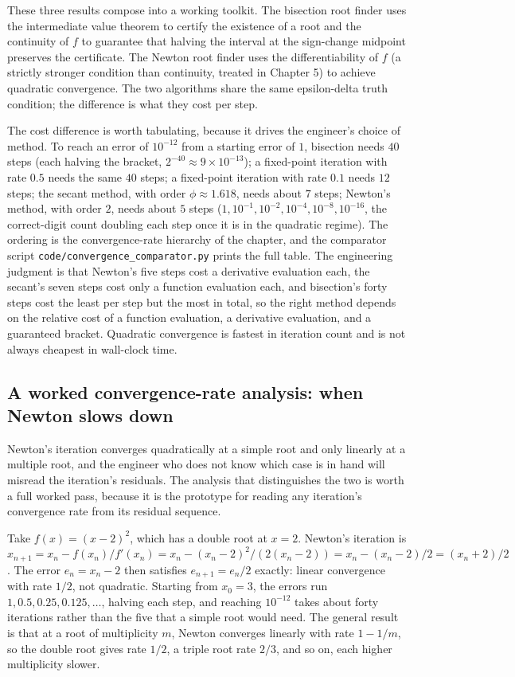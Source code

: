 These three results compose into a working toolkit. The bisection
root finder uses the intermediate value theorem to certify the
existence of a root and the continuity of $f$ to guarantee that
halving the interval at the sign-change midpoint preserves the
certificate. The Newton root finder uses the differentiability of
$f$ (a strictly stronger condition than continuity, treated in
Chapter 5) to achieve quadratic convergence. The two algorithms
share the same epsilon-delta truth condition; the difference is what
they cost per step.

The cost difference is worth tabulating, because it drives the
engineer's choice of method. To reach an error of $10^{-12}$ from a
starting error of $1$, bisection needs $40$ steps (each halving the
bracket, $2^{-40} \approx 9 \times 10^{-13}$); a fixed-point iteration
with rate $0.5$ needs the same $40$ steps; a fixed-point iteration with
rate $0.1$ needs $12$ steps; the secant method, with order $\phi
\approx 1.618$, needs about $7$ steps; Newton's method, with order $2$,
needs about $5$ steps ($1, 10^{-1}, 10^{-2}, 10^{-4}, 10^{-8},
10^{-16}$, the correct-digit count doubling each step once it is in the
quadratic regime). The ordering is the convergence-rate hierarchy of
the chapter, and the comparator script
\texttt{code/convergence\_comparator.py} prints the full table. The
engineering judgment is that Newton's five steps cost a derivative
evaluation each, the secant's seven steps cost only a function
evaluation each, and bisection's forty steps cost the least per step
but the most in total, so the right method depends on the relative cost
of a function evaluation, a derivative evaluation, and a guaranteed
bracket. Quadratic convergence is fastest in iteration count and is not
always cheapest in wall-clock time.

\subsection{A worked convergence-rate analysis: when Newton slows down}

Newton's iteration converges quadratically at a simple root and only
linearly at a multiple root, and the engineer who does not know which
case is in hand will misread the iteration's residuals. The analysis
that distinguishes the two is worth a full worked pass, because it is
the prototype for reading any iteration's convergence rate from its
residual sequence.

Take $f(x) = (x - 2)^{2}$, which has a double root at $x = 2$. Newton's
iteration is $x_{n+1} = x_{n} - f(x_{n})/f'(x_{n}) = x_{n} - (x_{n} -
2)^{2}/(2(x_{n} - 2)) = x_{n} - (x_{n} - 2)/2 = (x_{n} + 2)/2$. The
error $e_{n} = x_{n} - 2$ then satisfies $e_{n+1} = e_{n}/2$ exactly:
linear convergence with rate $1/2$, not quadratic. Starting from $x_{0}
= 3$, the errors run $1, 0.5, 0.25, 0.125, \ldots$, halving each step,
and reaching $10^{-12}$ takes about forty iterations rather than the
five that a simple root would need. The general result is that at a root
of multiplicity $m$, Newton converges linearly with rate $1 - 1/m$, so
the double root gives rate $1/2$, a triple root rate $2/3$, and so on,
each higher multiplicity slower.

